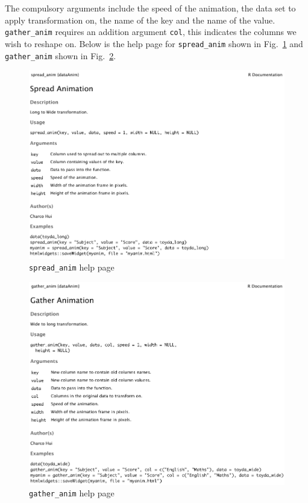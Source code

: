 The compulsory arguments include the speed of the animation, the data set to apply transformation on, the name of the key and the name of the value. \texttt{gather\_anim} requires an addition argument \texttt{col}, this indicates the columns we wish to reshape on. Below is the help page for \texttt{spread\_anim} shown in Fig.~\ref{fig:spreadhelp} and \texttt{gather\_anim} shown in Fig.~\ref{fig:gatherhelp}.

\begin{figure}[H]
    \centering
    \includegraphics[scale = 0.42]{Masters-Thesis/img/spreadhelp.png}
    \caption{\texttt{spread\_anim} help page}
    \label{fig:spreadhelp}
\end{figure}

\begin{figure}[H]
    \centering
    \includegraphics[scale = 0.42]{Masters-Thesis/img/gatherhelp.png}
    \caption{\texttt{gather\_anim} help page}
    \label{fig:gatherhelp}
\end{figure}

